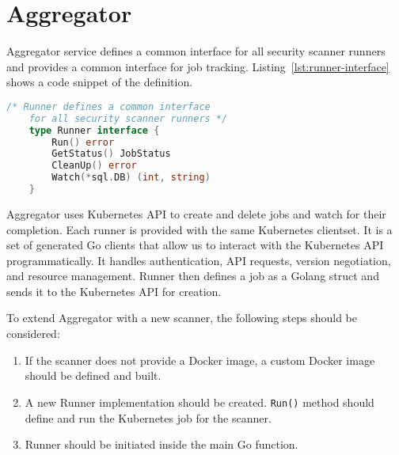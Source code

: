 \section{Aggregator}
\label{sec:aggregator}

Aggregator service defines a common interface for all security scanner runners and provides a common interface for job tracking. Listing~\ref{lst:runner-interface} shows a code snippet of the definition.

\begin{lstlisting}[language=Go, caption={[A common inteface for runners] A common inteface for runners.}, label={lst:runner-interface}]
    /* Runner defines a common interface 
    for all security scanner runners */
    type Runner interface {
        Run() error
        GetStatus() JobStatus
        CleanUp() error
        Watch(*sql.DB) (int, string)
    }
\end{lstlisting}

Aggregator uses Kubernetes API to create and delete jobs and watch for their completion. Each runner is provided with the same Kubernetes clientset. It is a set of generated Go clients that allow us to interact with the Kubernetes API programmatically. It handles authentication, API requests, version negotiation, and resource management. Runner then defines a job as a Golang struct and sends it to the Kubernetes API for creation.

To extend Aggregator with a new scanner, the following steps should be considered:
\begin{enumerate}
    \item If the scanner does not provide a Docker image, a custom Docker image should be defined and built.
    \item A new Runner implementation should be created. \lstinline{Run()} method should define and run the Kubernetes job for the scanner.
    \item Runner should be initiated inside the main Go function.
\end{enumerate}
